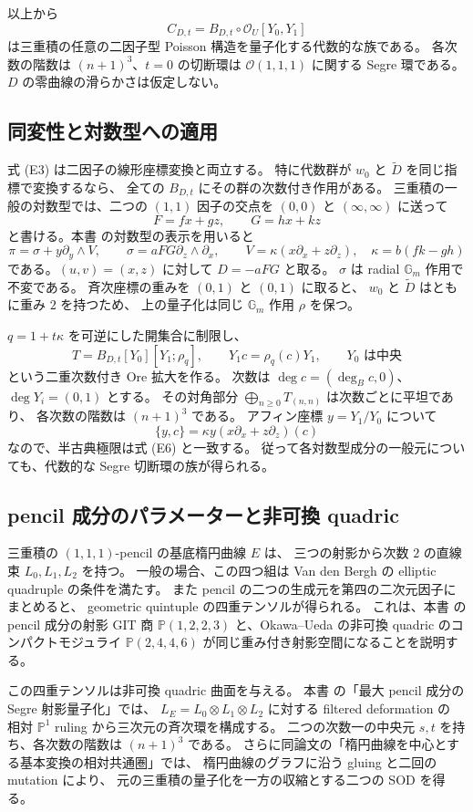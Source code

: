以上から
\[
 C_{D,t}=B_{D,t}\mathbin{\circ}\mathcal O_U[Y_0,Y_1]
 \tag{E5}
\]
は三重積の任意の二因子型 Poisson 構造を量子化する代数的な族である。
各次数の階数は $(n+1)^3$、$t=0$ の切断環は
$\mathcal O(1,1,1)$ に関する Segre 環である。
$D$ の零曲線の滑らかさは仮定しない。

\subsection{同変性と対数型への適用}
\label{subsec:quant-elliptic-equivariance}

式 (E3) は二因子の線形座標変換と両立する。
特に代数群が $w_0$ と $\widetilde D$ を同じ指標で変換するなら、
全ての $B_{D,t}$ にその群の次数付き作用がある。
三重積の一般の対数型では、二つの $(1,1)$ 因子の交点を
$(0,0)$ と $(\infty,\infty)$ に送って
\[
 F=f x+g z,\qquad G=h x+k z
\]
と書ける。本書 の対数型の表示を用いると
\[
 \pi=\sigma+y\partial_y\wedge V,\qquad
 \sigma=aFG\partial_z\wedge\partial_x,\qquad
 V=\kappa(x\partial_x+z\partial_z),\quad
 \kappa=b(fk-gh)
 \tag{E6}
\]
である。$(u,v)=(x,z)$ に対して $D=-aFG$ と取る。
$\sigma$ は radial $\mathbb G_m$ 作用で不変である。
斉次座標の重みを $(0,1)$ と $(0,1)$ に取ると、
$w_0$ と $\widetilde D$ はともに重み $2$ を持つため、
上の量子化は同じ $\mathbb G_m$ 作用 $\rho$ を保つ。

$q=1+t\kappa$ を可逆にした開集合に制限し、
\[
 T=B_{D,t}[Y_0][Y_1;\rho_q],\qquad
 Y_1c=\rho_q(c)Y_1,\qquad Y_0\text{ は中央}
 \tag{E7}
\]
という二重次数付き Ore 拡大を作る。
次数は $\deg c=(\deg_B c,0)$、$\deg Y_i=(0,1)$ とする。
その対角部分 $\bigoplus_{n\geq0}T_{(n,n)}$ は次数ごとに平坦であり、
各次数の階数は $(n+1)^3$ である。
アフィン座標 $y=Y_1/Y_0$ について
\[
 \{y,c\}=\kappa y(x\partial_x+z\partial_z)(c)
\]
なので、半古典極限は式 (E6) と一致する。
従って各対数型成分の一般元についても、代数的な
Segre 切断環の族が得られる。

\subsection{pencil 成分のパラメーターと非可換 quadric}
\label{subsec:quant-pencil-parameters}

三重積の $(1,1,1)$-pencil の基底楕円曲線 $E$ は、
三つの射影から次数 $2$ の直線束 $L_0,L_1,L_2$ を持つ。
一般の場合、この四つ組は Van den Bergh の elliptic quadruple の条件を満たす。
また pencil の二つの生成元を第四の二次元因子にまとめると、
geometric quintuple の四重テンソルが得られる。
これは、本書 の pencil 成分の射影 GIT 商
$\mathbb P(1,2,2,3)$ と、Okawa--Ueda
\cite[定理1.1]{OkawaUedaQuadrics} の非可換 quadric のコンパクトモジュライ
$\mathbb P(2,4,4,6)$ が同じ重み付き射影空間になることを説明する。

この四重テンソルは非可換 quadric 曲面を与える。
本書 の「最大 pencil 成分の Segre 射影量子化」では、
$L_E=L_0\otimes L_1\otimes L_2$ に対する filtered deformation の
相対 $\mathbb P^1$ ruling から三次元の斉次環を構成する。
二つの次数一の中央元 $s,t$ を持ち、各次数の階数は $(n+1)^3$ である。
さらに同論文の「楕円曲線を中心とする基本変換の相対共通圏」では、
楕円曲線のグラフに沿う gluing と二回の mutation により、
元の三重積の量子化を一方の収縮とする二つの SOD を得る。
